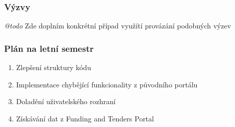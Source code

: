 \documentclass[10pt,xcolor=pdflatex]{beamer}
\begin{document}
\begin{frame}
    \frametitle{Výzvy}
    \emph{@todo} Zde doplním konkrétní případ využítí provázání podobných výzev
\end{frame}

\begin{frame}
    \frametitle{Plán na letní semestr}
    \begin{enumerate}
        \item Zlepšení struktury kódu
        \item Implementace chybějící funkcionality z původního portálu
        \item Doladění uživatelského rozhraní
        \item Získávání dat z Funding and Tenders Portal
    \end{enumerate}
\end{frame}

\end{document}
